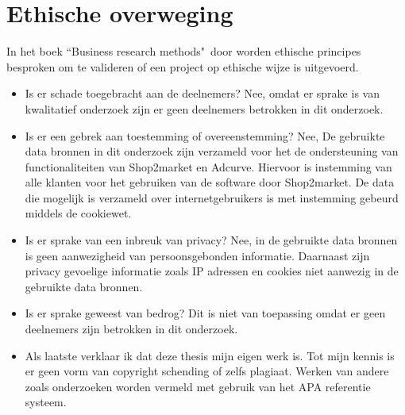 \clearpage

\section{Ethische overweging}

In het boek ``Business research methods"\ door \textcite{bryman2015business} worden ethische principes besproken om te valideren of een project op ethische wijze is uitgevoerd.

\begin{itemize}
    \item Is er schade toegebracht aan de deelnemers? Nee, omdat er sprake is van kwalitatief onderzoek zijn er geen deelnemers betrokken in dit onderzoek.
    \item Is er een gebrek aan toestemming of overeenstemming? Nee, De gebruikte data bronnen in dit onderzoek zijn verzameld voor het de ondersteuning van functionaliteiten van Shop2market en Adcurve. Hiervoor is instemming van alle klanten voor het gebruiken van de software door Shop2market. De data die mogelijk is verzameld over internetgebruikers is met instemming gebeurd middels de cookiewet.
    \item Is er sprake van een inbreuk van privacy? Nee, in de gebruikte data bronnen is geen aanwezigheid van persoonsgebonden informatie. Daarnaast zijn privacy gevoelige informatie zoals IP adressen en cookies niet aanwezig in de gebruikte data bronnen.
    \item Is er sprake geweest van bedrog? Dit is niet van toepassing omdat er geen deelnemers zijn betrokken in dit onderzoek.
    \item Als laatste verklaar ik dat deze thesis mijn eigen werk is. Tot mijn kennis is er geen vorm van copyright schending of zelfs plagiaat. Werken van andere zoals onderzoeken worden vermeld met gebruik van het APA referentie systeem.
\end{itemize}